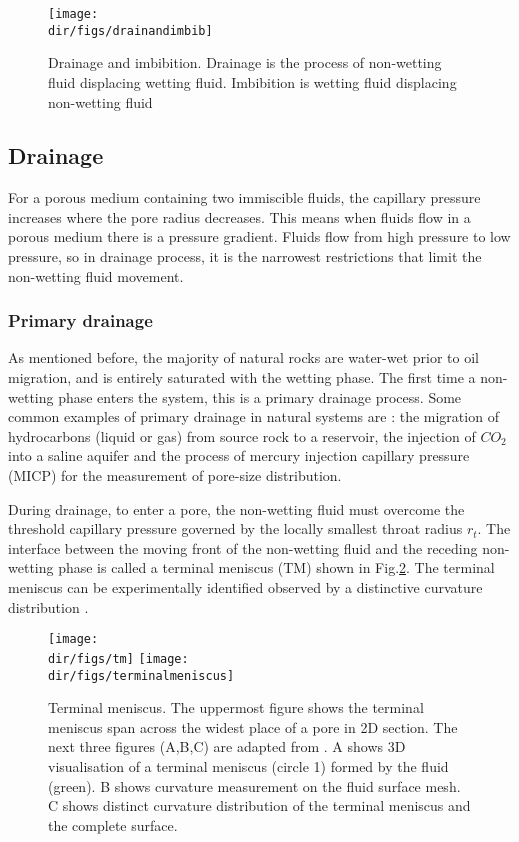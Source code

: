\begin{figure}[htbp]
  \centering
  \texttt{[image: \\dir/figs/drainandimbib]}
  \caption{Drainage and imbibition. Drainage is the process of non-wetting fluid displacing wetting fluid. Imbibition is wetting fluid displacing non-wetting fluid}
  \label{drainandimbib}
\end{figure}

\subsection{Drainage}
For a porous medium containing two immiscible fluids, the capillary pressure increases where the pore radius decreases. This means when fluids flow in a porous medium there is a pressure gradient. Fluids flow from high pressure to low pressure, so in drainage process, it is the narrowest restrictions that limit the non-wetting fluid movement.

\subsubsection{Primary drainage}
As mentioned before, the majority of natural rocks are water-wet prior to oil migration, and is entirely saturated with the wetting phase. The first time a non-wetting phase enters the system, this is a primary drainage process. Some common examples of primary drainage in natural systems are \citep{blunt2017multiphase}: the migration of hydrocarbons (liquid or gas) from source rock to a reservoir, the injection of $CO_2$ into a saline aquifer and the process of mercury injection capillary pressure (MICP) for the measurement of pore-size distribution.

During drainage, to enter a pore, the non-wetting fluid must overcome the threshold capillary pressure governed by the locally smallest throat radius $r_t$. The interface between the moving front of the non-wetting fluid and the receding non-wetting phase is called a terminal meniscus (TM) shown in Fig.\ref{tm}. The terminal meniscus can be experimentally identified observed by a distinctive curvature distribution \citep{andrew2015imaging}.

\begin{figure}[htbp]
  \centering
  \texttt{[image: \\dir/figs/tm]}
  \texttt{[image: \\dir/figs/terminalmeniscus]}
  \caption{Terminal meniscus. The uppermost figure shows the terminal meniscus span across the widest place of a pore in 2D section. The next three figures (A,B,C) are adapted from \citet{andrew2015imaging}. A shows 3D visualisation of a terminal meniscus (circle 1) formed by the fluid (green). B shows curvature measurement on the fluid surface mesh. C shows distinct curvature distribution of the terminal meniscus and the complete surface.}
  \label{tm}
\end{figure}

